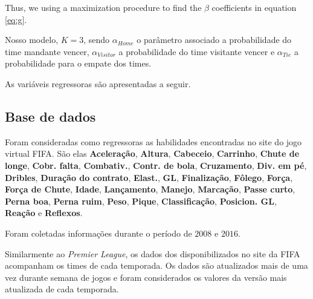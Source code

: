 \documentclass[review]{elsarticle}
\begin{document}
Thus, we using a maximization procedure to find the $\beta$ coefficients in equation \ref{eq:g}.

Nosso modelo, $K=3$, sendo $\alpha_{Home}$ o parâmetro associado a probabilidade do time mandante vencer, $\alpha_{Visitor}$ a probabilidade do time visitante vencer e $\alpha_{Tie}$ a probabilidade para o empate dos times.

As variáveis regressoras são apresentadas a seguir. 

\subsection{Base de dados}
\label{sec:data}


Foram consideradas como regressoras as habilidades encontradas no site do jogo virtual FIFA. São elas \textbf{Aceleração},  \textbf{Altura},  \textbf{Cabeceio},  \textbf{Carrinho},  \textbf{Chute de longe},  \textbf{Cobr. falta},  \textbf{Combativ.},  \textbf{Contr. de bola},  \textbf{Cruzamento},  \textbf{Div. em pé},  \textbf{Dribles},  \textbf{Duração do contrato},  \textbf{Elast.},  \textbf{GL},  \textbf{Finalização},  \textbf{Fôlego},  \textbf{Força},  \textbf{Força de Chute},  \textbf{Idade},  \textbf{Lançamento},  \textbf{Manejo},  \textbf{Marcação},  \textbf{Passe curto},  \textbf{Perna boa},  \textbf{Perna ruim},  \textbf{Peso},  \textbf{Pique},  \textbf{Classificação},  \textbf{Posicion. GL},  \textbf{Reação} e  \textbf{Reflexos}.

Foram coletadas informações durante o período de $2008$ e $2016$.


Similarmente ao \textit{Premier League}, os dados dos disponibilizados no site da FIFA acompanham os times de cada temporada. Os dados são atualizados mais de uma vez durante semana de jogos e foram considerados os valores da versão mais atualizada de cada temporada.
\end{document}
